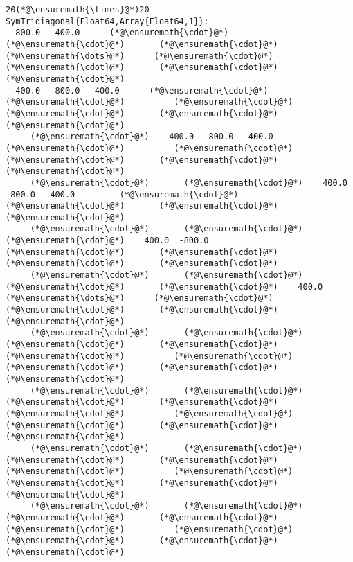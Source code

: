 \documentclass[12pt,landscape]{article}
\begin{document}
{%
{\large
\begin{lstlisting}
20(*@\ensuremath{\times}@*)20 SymTridiagonal{Float64,Array{Float64,1}}:
 -800.0   400.0      (*@\ensuremath{\cdot}@*)       (*@\ensuremath{\cdot}@*)       (*@\ensuremath{\cdot}@*)   (*@\ensuremath{\dots}@*)      (*@\ensuremath{\cdot}@*)       (*@\ensuremath{\cdot}@*)       (*@\ensuremath{\cdot}@*)       (*@\ensuremath{\cdot}@*) 
  400.0  -800.0   400.0      (*@\ensuremath{\cdot}@*)       (*@\ensuremath{\cdot}@*)          (*@\ensuremath{\cdot}@*)       (*@\ensuremath{\cdot}@*)       (*@\ensuremath{\cdot}@*)       (*@\ensuremath{\cdot}@*) 
     (*@\ensuremath{\cdot}@*)    400.0  -800.0   400.0      (*@\ensuremath{\cdot}@*)          (*@\ensuremath{\cdot}@*)       (*@\ensuremath{\cdot}@*)       (*@\ensuremath{\cdot}@*)       (*@\ensuremath{\cdot}@*) 
     (*@\ensuremath{\cdot}@*)       (*@\ensuremath{\cdot}@*)    400.0  -800.0   400.0         (*@\ensuremath{\cdot}@*)       (*@\ensuremath{\cdot}@*)       (*@\ensuremath{\cdot}@*)       (*@\ensuremath{\cdot}@*) 
     (*@\ensuremath{\cdot}@*)       (*@\ensuremath{\cdot}@*)       (*@\ensuremath{\cdot}@*)    400.0  -800.0         (*@\ensuremath{\cdot}@*)       (*@\ensuremath{\cdot}@*)       (*@\ensuremath{\cdot}@*)       (*@\ensuremath{\cdot}@*) 
     (*@\ensuremath{\cdot}@*)       (*@\ensuremath{\cdot}@*)       (*@\ensuremath{\cdot}@*)       (*@\ensuremath{\cdot}@*)    400.0  (*@\ensuremath{\dots}@*)      (*@\ensuremath{\cdot}@*)       (*@\ensuremath{\cdot}@*)       (*@\ensuremath{\cdot}@*)       (*@\ensuremath{\cdot}@*) 
     (*@\ensuremath{\cdot}@*)       (*@\ensuremath{\cdot}@*)       (*@\ensuremath{\cdot}@*)       (*@\ensuremath{\cdot}@*)       (*@\ensuremath{\cdot}@*)          (*@\ensuremath{\cdot}@*)       (*@\ensuremath{\cdot}@*)       (*@\ensuremath{\cdot}@*)       (*@\ensuremath{\cdot}@*) 
     (*@\ensuremath{\cdot}@*)       (*@\ensuremath{\cdot}@*)       (*@\ensuremath{\cdot}@*)       (*@\ensuremath{\cdot}@*)       (*@\ensuremath{\cdot}@*)          (*@\ensuremath{\cdot}@*)       (*@\ensuremath{\cdot}@*)       (*@\ensuremath{\cdot}@*)       (*@\ensuremath{\cdot}@*) 
     (*@\ensuremath{\cdot}@*)       (*@\ensuremath{\cdot}@*)       (*@\ensuremath{\cdot}@*)       (*@\ensuremath{\cdot}@*)       (*@\ensuremath{\cdot}@*)          (*@\ensuremath{\cdot}@*)       (*@\ensuremath{\cdot}@*)       (*@\ensuremath{\cdot}@*)       (*@\ensuremath{\cdot}@*) 
     (*@\ensuremath{\cdot}@*)       (*@\ensuremath{\cdot}@*)       (*@\ensuremath{\cdot}@*)       (*@\ensuremath{\cdot}@*)       (*@\ensuremath{\cdot}@*)          (*@\ensuremath{\cdot}@*)       (*@\ensuremath{\cdot}@*)       (*@\ensuremath{\cdot}@*)       (*@\ensuremath{\cdot}@*) 

\end{lstlisting}}}
\end{document}
